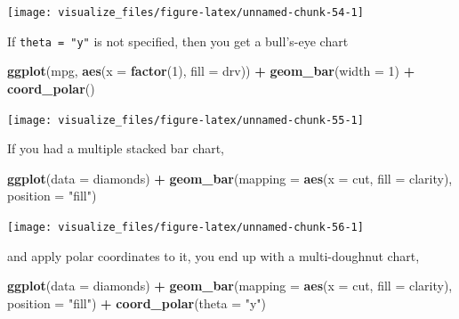 \documentclass[]{book}
\newenvironment{Shaded}{\begin{snugshade}}{\end{snugshade}}
\newcommand{\DataTypeTok}[1]{\textcolor[rgb]{0.13,0.29,0.53}{#1}}
\newcommand{\DecValTok}[1]{\textcolor[rgb]{0.00,0.00,0.81}{#1}}
\newcommand{\KeywordTok}[1]{\textcolor[rgb]{0.13,0.29,0.53}{\textbf{#1}}}
\newcommand{\NormalTok}[1]{#1}
\newcommand{\OperatorTok}[1]{\textcolor[rgb]{0.81,0.36,0.00}{\textbf{#1}}}
\newcommand{\StringTok}[1]{\textcolor[rgb]{0.31,0.60,0.02}{#1}}
\theoremstyle{plain}
\theoremstyle{remark}
\begin{document}
\begin{center}\texttt{[image: visualize\_files/figure-latex/unnamed-chunk-54-1]} \end{center}

If \texttt{theta\ =\ "y"} is not specified, then you get a bull's-eye chart

\begin{Shaded}
\begin{Highlighting}[]
\KeywordTok{ggplot}\NormalTok{(mpg, }\KeywordTok{aes}\NormalTok{(}\DataTypeTok{x =} \KeywordTok{factor}\NormalTok{(}\DecValTok{1}\NormalTok{), }\DataTypeTok{fill =}\NormalTok{ drv)) }\OperatorTok{+}
\StringTok{  }\KeywordTok{geom_bar}\NormalTok{(}\DataTypeTok{width =} \DecValTok{1}\NormalTok{) }\OperatorTok{+}
\StringTok{  }\KeywordTok{coord_polar}\NormalTok{()}
\end{Highlighting}
\end{Shaded}

\begin{center}\texttt{[image: visualize\_files/figure-latex/unnamed-chunk-55-1]} \end{center}

If you had a multiple stacked bar chart,

\begin{Shaded}
\begin{Highlighting}[]
\KeywordTok{ggplot}\NormalTok{(}\DataTypeTok{data =}\NormalTok{ diamonds) }\OperatorTok{+}
\StringTok{  }\KeywordTok{geom_bar}\NormalTok{(}\DataTypeTok{mapping =} \KeywordTok{aes}\NormalTok{(}\DataTypeTok{x =}\NormalTok{ cut, }\DataTypeTok{fill =}\NormalTok{ clarity), }\DataTypeTok{position =} \StringTok{"fill"}\NormalTok{)}
\end{Highlighting}
\end{Shaded}

\begin{center}\texttt{[image: visualize\_files/figure-latex/unnamed-chunk-56-1]} \end{center}

and apply polar coordinates to it, you end up with a multi-doughnut chart,

\begin{Shaded}
\begin{Highlighting}[]
\KeywordTok{ggplot}\NormalTok{(}\DataTypeTok{data =}\NormalTok{ diamonds) }\OperatorTok{+}
\StringTok{  }\KeywordTok{geom_bar}\NormalTok{(}\DataTypeTok{mapping =} \KeywordTok{aes}\NormalTok{(}\DataTypeTok{x =}\NormalTok{ cut, }\DataTypeTok{fill =}\NormalTok{ clarity), }\DataTypeTok{position =} \StringTok{"fill"}\NormalTok{) }\OperatorTok{+}
\StringTok{  }\KeywordTok{coord_polar}\NormalTok{(}\DataTypeTok{theta =} \StringTok{"y"}\NormalTok{)}
\end{Highlighting}
\end{Shaded}
\end{document}
